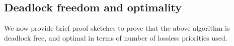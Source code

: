 
\subsection {Deadlock freedom and optimality}
\label{subsec:specific_deadlock_free}

We now provide brief proof sketches to prove that the above algorithm is
deadlock free, and optimal in terms of number of lossless priorities used.

